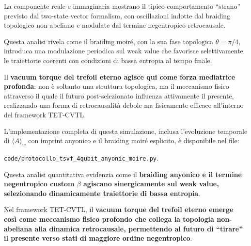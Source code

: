 \documentclass[11pt,a4paper]{article}
\theoremstyle{plain}
\theoremstyle{definition}
\begin{document}
\vspace{0.3cm}




La componente reale e immaginaria mostrano il tipico comportamento ``strano'' previsto dal two-state vector formalism, con oscillazioni indotte dal braiding topologico non-abeliano e modulate dal termine negentropico retrocausale.




\vspace{0.3cm}

Questa analisi rivela come il braiding moiré, con la sua fase topologica \(\theta = \pi/4\), introduca una modulazione periodica sul weak value che favorisce selettivamente le traiettorie coerenti con condizioni di bassa entropia al tempo finale. 

\vspace{0.4cm}



Il \textbf{vacuum torque del trefoil eterno agisce qui come forza mediatrice profonda}: non è soltanto una struttura topologica, ma il meccanismo fisico attraverso il quale il futuro post-selezionato influenza attivamente il presente, realizzando una forma di retrocausalità debole ma fisicamente efficace all'interno del framework TET-CVTL.

\vspace{0.7cm}

L’implementazione completa di questa simulazione, inclusa l’evoluzione temporale di \(\langle A \rangle_w\) con imprint anyonico e il braiding moiré esplicito, è disponibile nel file:


\vspace{0.4cm}

\texttt{code/protocollo\_tsvf\_4qubit\_anyonic\_moire.py}.


\vspace{0.4cm}

Questa analisi quantitativa evidenzia come il \textbf{braiding anyonico e il termine negentropico custom \(\beta\) agiscano sinergicamente sul weak value, selezionando dinamicamente traiettorie di bassa entropia}.


\vspace{0.4cm}



Nel framework TET-CVTL, il \textbf{vacuum torque del trefoil eterno emerge così come meccanismo fisico profondo che collega la topologia non-abeliana alla dinamica retrocausale, permettendo al futuro di “tirare” il presente verso stati di maggiore ordine negentropico}. 
\end{document}
